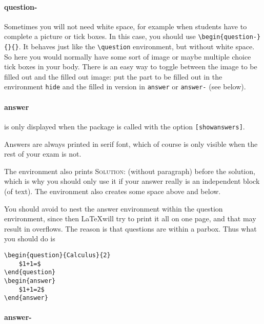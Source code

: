 \documentclass[a4paper]{scrartcl}
\begin{document}
\paragraph{question-}

Sometimes you will not need white space, for example when students have to complete a picture or tick boxes. In this case, you should use \verb|\begin{question-}{}{}|. It behaves just like the \verb+\question+ environment, but without white space. So here you would normally have some sort of image or maybe multiple choice tick boxes in your body. There is an easy way to toggle between the image to be filled out and the filled out image: put the part to be filled out in the environment \verb|hide| and the filled in version in \verb|answer| or \verb|answer-| (see below).


\paragraph{answer}

is only displayed when the package is called with the option \verb+[showanswers]+. 

Answers are always printed in serif font, which of course is only visible when the rest of your exam is not. 

The environment also prints \textsc{Solution:} (without paragraph) before the solution, which is why you should only use it if your answer really is an independent block (of text). The  environment also creates some space above and below.

You should avoid to nest the answer environment within the question environment, since then \LaTeX will try to print it all on one page, and that may result in overflows. The reason is that questions are within a parbox. Thus what you should do is

\begin{verbatim}
\begin{question}{Calculus}{2}
    $1+1=$
\end{question}    
\begin{answer}
    $1+1=2$
\end{answer}
\end{verbatim}



\paragraph{answer-}
\end{document}
